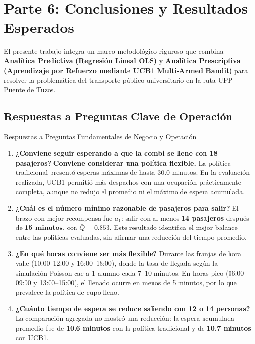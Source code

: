\section{Parte 6: Conclusiones y Resultados Esperados}

El presente trabajo integra un marco metodológico riguroso que combina \textbf{Analítica Predictiva (Regresión Lineal OLS)} y \textbf{Analítica Prescriptiva (Aprendizaje por Refuerzo mediante UCB1 Multi-Armed Bandit)} para resolver la problemática del transporte público universitario en la ruta UPP--Puente de Tuzos.

\subsection{Respuestas a Preguntas Clave de Operación}

\begin{summarybox}{Respuestas a Preguntas Fundamentales de Negocio y Operación}
	\begin{enumerate}
		\item \textbf{¿Conviene seguir esperando a que la combi se llene con 18 pasajeros?}
		\textbf{Conviene considerar una política flexible.} La política tradicional presentó esperas máximas de hasta $30.0$ minutos. En la evaluación realizada, UCB1 permitió más despachos con una ocupación prácticamente completa, aunque no redujo el promedio ni el máximo de espera acumulada.

		\item \textbf{¿Cuál es el número mínimo razonable de pasajeros para salir?}
		El brazo con mejor recompensa fue $a_1$: salir con al menos \textbf{14 pasajeros} después de \textbf{15 minutos}, con $\bar{Q}=0.853$. Este resultado identifica el mejor balance entre las políticas evaluadas, sin afirmar una reducción del tiempo promedio.

		\item \textbf{¿En qué horas conviene ser más flexible?}
		Durante las franjas de hora valle (10:00--12:00 y 16:00--18:00), donde la tasa de llegada según la simulación Poisson cae a 1 alumno cada 7--10 minutos. En horas pico (06:00--09:00 y 13:00--15:00), el llenado ocurre en menos de 5 minutos, por lo que prevalece la política de cupo lleno.

		\item \textbf{¿Cuánto tiempo de espera se reduce saliendo con 12 o 14 personas?}
		La comparación agregada no mostró una reducción: la espera acumulada promedio fue de \textbf{10.6 minutos} con la política tradicional y de \textbf{10.7 minutos} con UCB1.
	\end{enumerate}
\end{summarybox}

